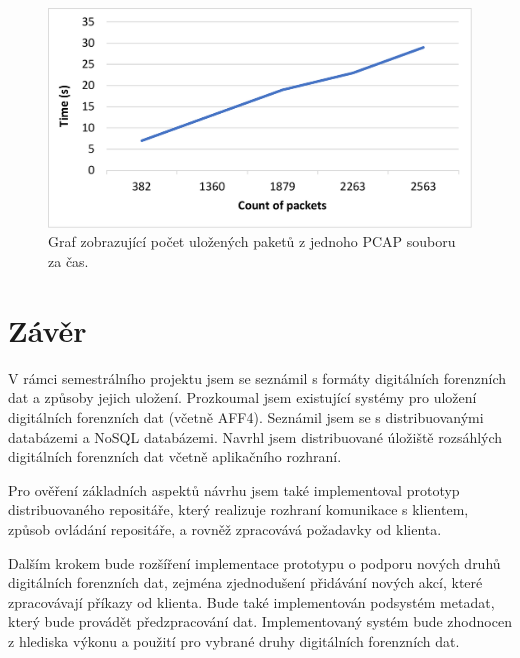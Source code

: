 \begin{figure}[!h]
  \centering
  \includegraphics[width=15cm]{template-fig/PerformanceChart.pdf}
  \caption{Graf zobrazující počet uložených paketů z jednoho PCAP souboru za čas.}
  \label{FIG_PerformanceChart}
\end{figure}



\chapter{Závěr}
V rámci semestrálního projektu jsem se seznámil s formáty digitálních forenzních dat a způsoby jejich uložení. Prozkoumal jsem existující systémy pro uložení digitálních forenzních dat (včetně AFF4). Seznámil jsem se s distribuovanými databázemi a NoSQL databázemi. Navrhl jsem distribuované úložiště rozsáhlých digitálních forenzních dat včetně aplikačního rozhraní.

Pro ověření základních aspektů návrhu jsem také implementoval prototyp distribuovaného repositáře, který realizuje rozhraní komunikace s klientem, způsob ovládání repositáře, a rovněž zpracovává požadavky od klienta.

Dalším krokem bude rozšíření implementace prototypu o podporu nových druhů digitálních forenzních dat, zejména zjednodušení přidávání nových akcí, které zpracovávají příkazy od klienta. Bude také implementován podsystém metadat, který bude provádět předzpracování dat.
Implementovaný systém bude zhodnocen z hlediska výkonu a použití pro vybrané druhy digitálních forenzních dat.

